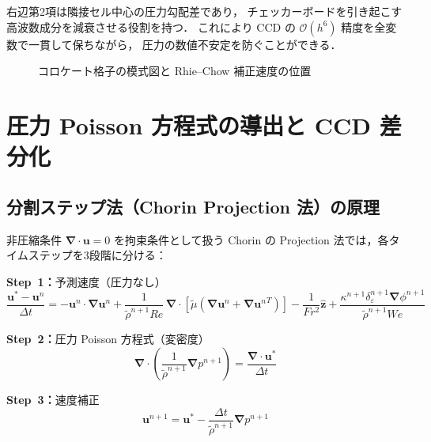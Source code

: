 \documentclass[12pt, a4paper, titlepage]{article}
\newcommand{\jp}[1]{{\normalfont\jpfont #1}}
\newcommand{\bu}{\bm{u}}
\newcommand{\bnabla}{\bm{\nabla}}
\newcommand{\de}{\delta_\varepsilon}
\newcommand{\Ord}[1]{\mathcal{O}(#1)}
\begin{document}
\jp{右辺第2項は隣接セル中心の圧力勾配差であり，
チェッカーボードを引き起こす高波数成分を減衰させる役割を持つ．
これにより CCD の $\Ord{h^6}$ 精度を全変数で一貫して保ちながら，
圧力の数値不安定を防ぐことができる．}

\begin{figure}[h]
\centering
{}
\caption{\jp{コロケート格子の模式図と Rhie--Chow 補正速度の位置}}
\label{fig:collocate}
\end{figure}


\section{\jp{圧力 Poisson 方程式の導出と CCD 差分化}}
\label{sec:pressure}

\subsection{\jp{分割ステップ法（Chorin Projection 法）の原理}}

\jp{非圧縮条件 $\bnabla\cdot\bu = 0$ を拘束条件として扱う Chorin \cite{Chorin1968} の
Projection 法では，各タイムステップを3段階に分ける：}

\begin{tcolorbox}[algbox, title={\jp{Projection 法の3段階}}]
\textbf{Step~1\jp{：}}\jp{予測速度（圧力なし）}
\begin{equation}
  \frac{\bu^* - \bu^n}{\Delta t}
  = -\bu^n\cdot\bnabla\bu^n
  + \frac{1}{\tilde{\rho}^{n+1} Re}\,\bnabla\cdot\!\left[\tilde{\mu}\!\left(\bnabla\bu^n + \bnabla{\bu^n}^T\right)\right]
  - \frac{1}{Fr^2}\hat{\bm{z}}
  + \frac{\kappa^{n+1}\de^{n+1}\bnabla\phi^{n+1}}{\tilde{\rho}^{n+1} We}
  \label{eq:predictor}
\end{equation}

\textbf{Step~2\jp{：}}\jp{圧力 Poisson 方程式（変密度）}
\begin{equation}
  \bnabla\cdot\!\left(\frac{1}{\tilde{\rho}^{n+1}}\bnabla p^{n+1}\right)
  = \frac{\bnabla\cdot\bu^*}{\Delta t}
  \label{eq:PPE_operator}
\end{equation}

\textbf{Step~3\jp{：}}\jp{速度補正}
\begin{equation}
  \bu^{n+1} = \bu^* - \frac{\Delta t}{\tilde{\rho}^{n+1}}\bnabla p^{n+1}
  \label{eq:corrector}
\end{equation}
\end{tcolorbox}
\end{document}
